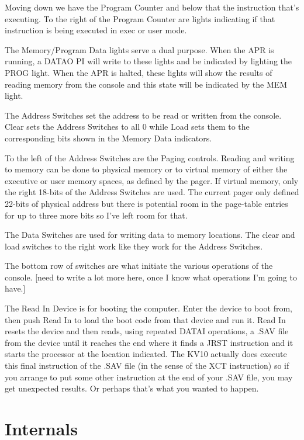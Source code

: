 \documentclass[12pt]{report}
\newcommand{\code}[1]{\textsf{#1}}
\begin{document}
Moving down we have the Program Counter and below that the instruction that's executing.
To the right of the Program Counter are lights indicating if that instruction is being
executed in exec or user mode.

The Memory/Program Data lights serve a dual purpose.  When the APR is running, a
\code{DATAO PI} will write to these lights and be indicated by lighting the PROG light.
When the APR is halted, these lights will show the results of reading memory from the
console and this state will be indicated by the MEM light.

The Address Switches set the address to be read or written from the console.  Clear sets
the Address Switches to all 0 while Load sets them to the corresponding bits shown in the
Memory Data indicators.

To the left of the Address Switches are the Paging controls.  Reading and writing to
memory can be done to physical memory or to virtual memory of either the executive or
user memory spaces, as defined by the pager.  If virtual memory, only the right 18-bits of
the Address Switches are used.  The current pager only defined 22-bits of physical address
but there is potential room in the page-table entries for up to three more bits so I've
left room for that.

The Data Switches are used for writing data to memory locations.  The clear and load
switches to the right work like they work for the Address Switches.

The bottom row of switches are what initiate the various operations of the console.  [need
  to write a lot more here, once I know what operations I'm going to have.]

The Read In Device is for booting the computer.  Enter the device to boot from, then push
Read In to load the boot code from that device and run it.  Read In resets the device and
then reads, using repeated DATAI operations, a .SAV file from the device until it reaches
the end where it finds a \code{JRST} instruction and it starts the processor at the
location indicated.  The KV10 actually does execute this final instruction of the .SAV
file (in the sense of the \code{XCT} instruction) so if you arrange to put some other
instruction at the end of your .SAV file, you may get unexpected results.  Or perhaps
that's what you wanted to happen.


\chapter{Internals}
\end{document}
